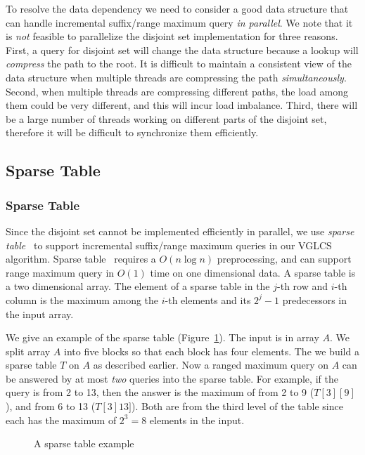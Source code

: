 To resolve the data dependency we need to consider a good data
structure that can handle incremental suffix/range maximum query {\em
  in parallel}.  We note that it is {\em not} feasible to parallelize
the disjoint set implementation for three reasons.  First, a query for
disjoint set will change the data structure because a lookup will {\em
  compress} the path to the root.  It is difficult to maintain a
consistent view of the data structure when multiple threads are
compressing the path {\em simultaneously}.  Second, when multiple
threads are compressing different paths, the load among them could be
very different, and this will incur load imbalance.  Third, there will
be a large number of threads working on different parts of the
disjoint set, therefore it will be difficult to synchronize them
efficiently.

\ifdefined\MasterThesis
\subsection{Sparse Table}
\else
\subsubsection{Sparse Table}
\fi
\label{sec:sparse-table}

Since the disjoint set cannot be implemented efficiently in parallel,
we use {\em sparse table}~\cite{Berkman1993RecursiveSP} to support
incremental suffix/range maximum queries in our VGLCS algorithm.
Sparse table~\cite{Berkman1993RecursiveSP} requires a $O(n \log n)$
preprocessing, and can support range maximum query in $O(1)$ time on
one dimensional data.  A sparse table is a two dimensional array.  The
element of a sparse table in the $j$-th row and $i$-th column is the
maximum among the $i$-th elements and its $2^j - 1$ predecessors in
the input array.

We give an example of the sparse table
(Figure~\ref{fig:interval-decomposition}).  The input is in array
$A$. We split array $A$ into five blocks so that each block has four
elements.  The we build a sparse table $T$ on $A$ as described
earlier.  Now a ranged maximum query on $A$ can be answered by at most
{\em two} queries into the sparse table.  For example, if the query is
from 2 to 13, then the answer is the maximum of from 2 to 9
($T[3][9]$), and from 6 to 13 ($T[3]13]$).  Both are from the third
  level of the table since each has the maximum of $2^3 = 8$ elements
  in the input.

\begin{figure}[!thb]
  \centering {} 
  \caption{A sparse table example}
  \label{fig:interval-decomposition}
\end{figure}

